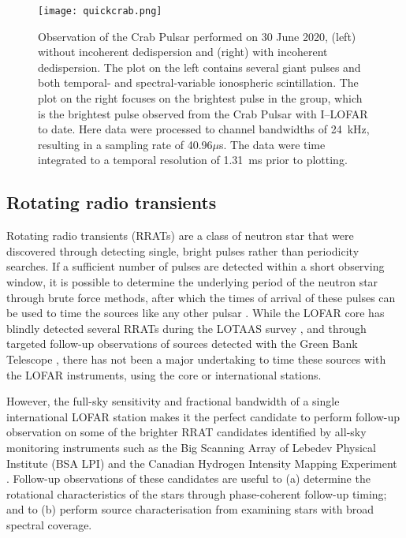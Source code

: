 \begin{figure}
    \centering
    \texttt{[image: quickcrab.png]}
    \caption[Observation of the Crab Pulsar performed on 30 June 2020.]{Observation of the Crab Pulsar performed on 30 June 2020, (left) without incoherent dedispersion and (right) with incoherent dedispersion. The plot on the left contains several giant pulses and both temporal- and spectral-variable ionospheric scintillation.  The plot on the right focuses on the brightest pulse in the group, which is the brightest pulse observed from the Crab Pulsar with I--LOFAR to date. Here data were processed to channel bandwidths of 24~kHz, resulting in a sampling rate of 40.96$\mu$s. The data were time integrated to a temporal resolution of 1.31~ms prior to plotting.}
    \label{fig:giant_pulse}
\end{figure}

\subsection{Rotating radio transients}\label{sec:rratsurvey}
Rotating radio transients (RRATs) are a class of neutron star that were discovered through detecting single, bright pulses rather than periodicity searches. If a sufficient number of pulses are detected within a short observing window, it is possible to determine the underlying period of the neutron star through brute force methods, after which the times of arrival of these pulses can be used to time the sources like any other pulsar \citep{Keane2011}. While the LOFAR core has blindly detected several RRATs during the LOTAAS survey \citep{Sanidas2019, Michilli2020, Tan2020}, and through targeted follow-up observations of sources detected with the Green Bank Telescope \citep{Karako-Argaman2015}, there has not been a major undertaking to time these sources with the LOFAR instruments, using the core or international stations.

However, the full-sky sensitivity and fractional bandwidth of a single international LOFAR station makes it the perfect candidate to perform follow-up observation on some of the brighter RRAT candidates identified by all-sky monitoring instruments such as the Big Scanning Array of Lebedev Physical Institute (BSA LPI) and the Canadian Hydrogen Intensity Mapping Experiment \citep[CHIME;][]{Amiri2018}. Follow-up observations of these candidates are useful to (a) determine the rotational characteristics of the stars through phase-coherent follow-up timing; and to (b) perform source characterisation from examining stars with broad spectral coverage.

